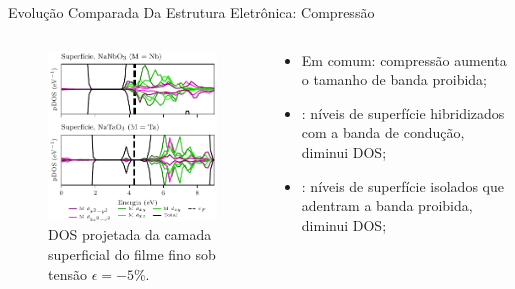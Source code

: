 \begin{frame}{Evolução Comparada Da Estrutura Eletrônica: Compressão}
	\begin{columns}
		\begin{column}{.5\textwidth}
			\begin{figure}[t]
				\centering
				\includegraphics{../floats/pdos_nn_nt_tf/pdos_c5_nn_nt_surface.pdf}
				\caption{DOS projetada da camada superficial do filme fino sob tensão $\epsilon = -5\%$.\label{fig:pdos_c5_nn_nt_surface}}
			\end{figure}
		\end{column}
		\begin{column}{.5\textwidth}
			\begin{itemize}
				\item Em comum: compressão \alert{aumenta} o tamanho de banda proibida;
				\item {}: níveis de superfície hibridizados com a banda de condução, diminui DOS;
				\item {}: níveis de superfície isolados que adentram a banda proibida, diminui DOS;
			\end{itemize}
		\end{column}
	\end{columns}
\end{frame}
